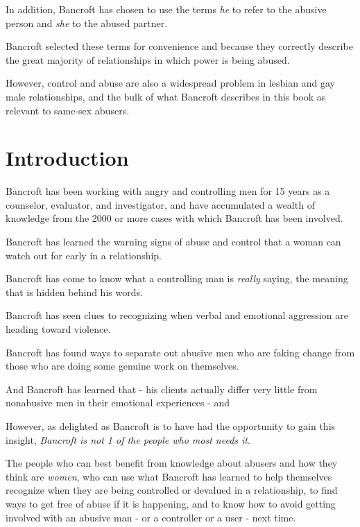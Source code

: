 \documentclass[oneside]{article}
\numberwithin{equation}{section}
\begin{document}
%
In addition, Bancroft has chosen to use the terms \textit{he} to refer to the abusive person and \textit{she} to the abused partner.

Bancroft selected these terms for convenience and because they correctly describe the great majority of relationships in which power is being abused.

However, control and abuse are also a widespread problem in lesbian and gay male relationships, and the bulk of what Bancroft describes in this book as relevant to same-sex abusers.

\section*{Introduction}
Bancroft has been working with angry and controlling men for 15 years as a counselor, evaluator, and investigator, and have accumulated a wealth of knowledge from the 2000 or more cases with which Bancroft has been involved.

Bancroft has learned the warning signs of abuse and control that a woman can watch out for early in a relationship.

Bancroft has come to know what a controlling man is \textit{really} saying, the meaning that is hidden behind his words.

Bancroft has seen clues to recognizing when verbal and emotional aggression are heading toward violence.

Bancroft has found ways to separate out abusive men who are faking change from those who are doing some genuine work on themselves.

And Bancroft has learned that  - his clients actually differ very little from nonabusive men in their emotional experiences - and 


%
However, as delighted as Bancroft is to have had the opportunity to gain this insight, \textit{Bancroft is not 1 of the people who most needs it}.

The people who can best benefit from knowledge about abusers and how they think are \textit{women}, who can use what Bancroft has learned to help themselves recognize when they are being controlled or devalued in a relationship, to find ways to get free of abuse if it is happening, and to know how to avoid getting involved with an abusive man - or a controller or a user - next time.
\end{document}
